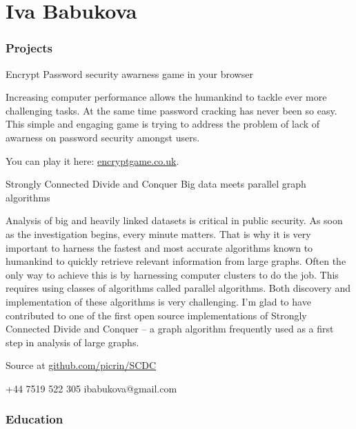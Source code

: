\documentclass{tccv}
\begin{document}
\setlength{\emergencystretch}{3em}
\part{Iva Babukova}

\section{\LARGE Projects \normalsize}

\begin{eventlist}

\item{Encrypt}
     {Password security awarness game in your browser}
     {Increasing computer performance allows the humankind to tackle ever more challenging tasks. At the same time password cracking has never been so easy. This simple and engaging game is trying to address the problem of lack of awarness on password security amongst users. \par\medskip You can play it here: \href{encryptgame.co.uk}{encryptgame.co.uk}.
     }

\item{Strongly Connected Divide and Conquer}
   {Big data meets parallel graph algorithms}
   {Analysis of big and heavily linked datasets is critical in public security. As soon as the investigation begins, every minute matters. That is why it is very important to harness the fastest and most accurate algorithms known to humankind to quickly retrieve relevant information from large graphs. Often the only way to achieve this is by harnessing computer clusters to do the job. This requires using classes of algorithms called parallel algorithms. Both discovery and implementation of these algorithms is very challenging. I'm glad to have contributed to one of the first open source implementations of Strongly Connected Divide and Conquer -- a graph algorithm frequently used as a first step in analysis of large graphs. \par\medskip
   Source at 
   \href{http://github.com/picrin/SCDC}{github.com/picrin/SCDC}
   }

\end{eventlist}

    {+44 7519 522 305}
    {ibabukova@gmail.com}

\section{\LARGE Education \normalsize}
\end{document}
